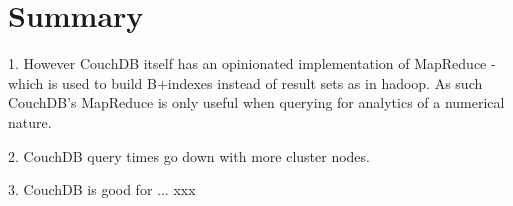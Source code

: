 \section{Summary}
1. However CouchDB itself has an opinionated implementation of MapReduce - which is used to build B+indexes instead of result sets as in hadoop. As such CouchDB's MapReduce is only useful when querying for analytics of a numerical nature.

2. CouchDB query times go down with more cluster nodes.

3. CouchDB is good for ... xxx